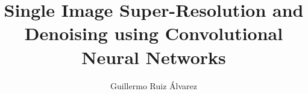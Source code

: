 \documentclass[runningheads]{llncs}
\begin{document}
	\title{Single Image Super-Resolution and Denoising using Convolutional Neural Networks}
	\author{Guillermo Ruiz Álvarez}
	
	\maketitle
	
	
	
	
	
	
	
	\printbibliography
\end{document}
